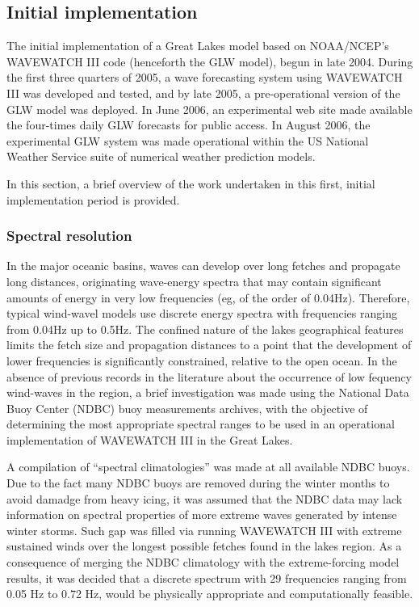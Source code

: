 \subsection{Initial implementation}

The initial implementation of a Great Lakes model based on NOAA/NCEP's WAVEWATCH
III code (henceforth the GLW model), begun in late 2004. During the first three
quarters of 2005, a wave forecasting system
using WAVEWATCH III was developed and tested, and by late 2005, a
pre-operational version of the GLW model was deployed. In June 2006, an
experimental web site made available
the four-times daily GLW forecasts for public access. In August 2006,
the experimental GLW system was made operational within the US National
Weather Service suite of numerical weather prediction models. 

In this section, a brief overview of the work undertaken in this first, initial
implementation period is provided.

\subsubsection{Spectral resolution}

In the major oceanic basins, waves can develop over long fetches and propagate
long distances, originating wave-energy spectra that may contain significant
amounts of energy in very low frequencies (eg, of the order of 0.04Hz).
Therefore, typical wind-wavel models use discrete energy spectra with
frequencies ranging from 0.04Hz up to 0.5Hz. The confined nature of the lakes
geographical features limits the fetch size and propagation distances to a point
that the development of lower frequencies is significantly constrained, relative
to the open ocean. In the absence of previous records in the literature about
the occurrence of low fequency wind-waves in the region, a brief investigation
was made using the National Data Buoy Center (NDBC) buoy measurements archives,
with the objective of determining the most appropriate spectral ranges to be
used in an operational implementation of WAVEWATCH III in the Great Lakes.

A compilation of ``spectral climatologies'' was made at all available NDBC
buoys. Due to the fact many NDBC buoys are removed during the winter months to
avoid damadge from heavy icing, it was assumed that the NDBC data may lack
information on spectral properties of more extreme waves generated by intense
winter storms. Such gap was filled via running WAVEWATCH III with extreme
sustained winds over the longest possible fetches found in the lakes region. As
a consequence of merging the NDBC climatology with the extreme-forcing model
results, it was decided that a discrete spectrum with 29 frequencies ranging
from 0.05 Hz to 0.72 Hz, would be physically appropriate and computationally
feasible.

